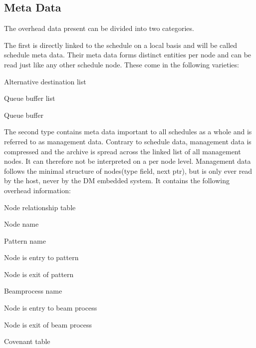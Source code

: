\subsection{Meta Data}
The overhead data present can be divided into two categories.
\par
The first is directly linked to the schedule on a local basis and will be called schedule meta data.
Their meta data forms distinct entities per node and can be read just like any other schedule node.
These come in the following varieties:
%
\begin{itemize}
  \begin{item} Alternative destination list \end{item}
  \begin{item} Queue buffer list \end{item}
  \begin{item} Queue buffer \end{item}
\end{itemize}
%
\par
The second type contains meta data important to all schedules as a whole and is referred to as management data.
Contrary to schedule data, management data is compressed and the archive is spread across the linked list of all management nodes. It can therefore not be interpreted on a per node level.
Management data follows the minimal structure of nodes(type field, next ptr), but is only ever read by the host, never by the DM embedded system.
It contains the following overhead information:
%
\begin{itemize}
  \begin{item} Node relationship table \end{item}
  \begin{itemize}
    \begin{item} Node name \end{item}
    \begin{item} Pattern name \end{item}
    \begin{item} Node is entry to pattern \end{item}
    \begin{item} Node is exit of pattern \end{item}
    \begin{item} Beamprocess name\end{item}
    \begin{item} Node is entry to beam process \end{item}
    \begin{item} Node is exit of beam process \end{item}
  \end{itemize}
  \begin{item} Covenant table \end{item}
\end{itemize}
%
